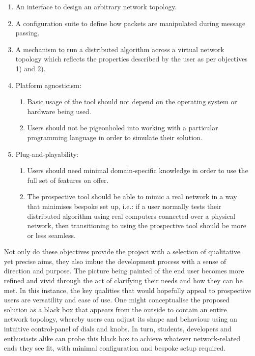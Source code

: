 \begin{enumerate}
    \item An interface to design an arbitrary network topology.
    \item A configuration suite to define how packets are manipulated during message passing.
    \item A mechanism to run a distributed algorithm across a virtual network topology which reflects the properties
    described by the user as per objectives 1) and 2).
    \item Platform agnosticism:
    \begin{enumerate}
        \item Basic usage of the tool should not depend on the operating system or hardware being used.
        \item Users should not be pigeonholed into working with a particular programming language in order to
        simulate their solution.
    \end{enumerate}
    \item Plug-and-playability:
    \begin{enumerate}
        \item Users should need minimal domain-specific knowledge in order to use the full set of features on offer.
        \item The prospective tool should be able to mimic a real network in a way that minimises bespoke set up,
        i.e.: if a user normally tests their distributed algorithm using real computers connected over a physical
        network, then transitioning to using the prospective tool should be more or less seamless.
    \end{enumerate}
\end{enumerate}

Not only do these objectives provide the project with a selection of qualitative yet precise aims, they also imbue
the development process with a sense of direction and purpose. The picture being painted of the end user becomes more
refined and vivid through the act of clarifying their needs and how they can be met. In this instance, the key
qualities that would hopefully appeal to prospective users are versatility and ease of use. One might conceptualise
the proposed solution as a black box that appears from the outside to contain an entire network topology, whereby
users can adjust its shape and behaviour using an intuitive control-panel of dials and knobs. In turn, students,
developers and enthusiasts alike can probe this black box to achieve whatever network-related ends they see fit, with
minimal configuration and bespoke setup required.



